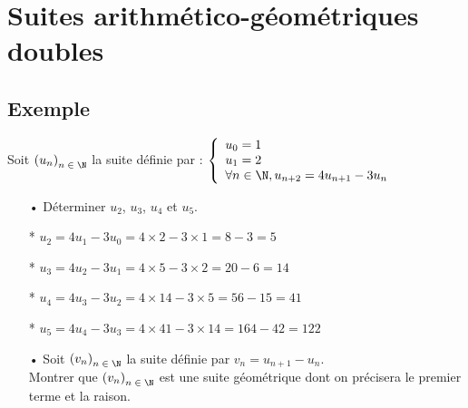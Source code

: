 \section{Suites arithmético-géométriques doubles}

\subsection{Exemple }

Soit $\left(u_n\right)_{n\; \in \; \N}$ la suite définie par : $\left\{
  \begin{array}{lll}
    u_0 = 1 \\
    u_1 = 2 \\
    \forall n \in \N, u_{n+2} = 4u_{n+1} - 3u_n
  \end{array}
\right.$

\vspace*{.3cm}

\begin{itemize}
\item[•] Déterminer $u_2$, $u_3$, $u_4$ et $u_5$. \\
\end{itemize}

\begin{itemize}
\item[*] $u_2 = 4u_1 - 3u_0 = 4 \times 2 - 3 \times 1 = 8 - 3 = 5$ \\
\item[*] $u_3 = 4u_2 - 3u_1 = 4 \times 5 - 3 \times 2 = 20 - 6 = 14$ \\
\item[*] $u_4 = 4u_3 - 3u_2 = 4 \times 14 - 3 \times 5 = 56 - 15 = 41$ \\
\item[*] $u_5 = 4u_4 - 3u_3 = 4 \times 41 - 3 \times 14 = 164 - 42 = 122$ \\
\end{itemize}

\vspace*{.3cm}

\begin{itemize}
\item[•] Soit $\left(v_n\right)_{n\; \in \; \N}$ la suite définie par $v_n = u_{n+1} - u_n$. \\ Montrer que $\left(v_n\right)_{n\; \in \; \N}$ est une suite géométrique dont on précisera le premier terme et la raison.
\end{itemize}

\vspace*{.3cm}

